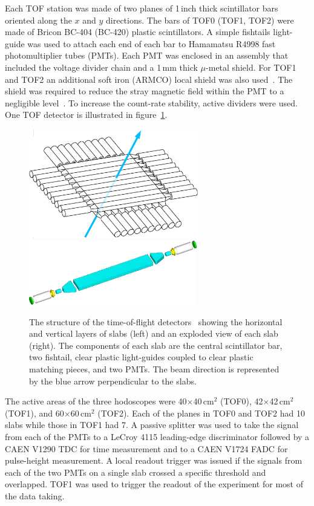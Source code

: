 Each TOF station was made of two planes of 1\,inch thick scintillator
bars oriented along the $x$ and $y$ directions. 
The bars of TOF0 (TOF1, TOF2) were made of Bricon BC-404 (BC-420) plastic scintillators.
A simple fishtails light-guide was used to attach each end of each bar
to Hamamatsu R4998 fast photomultiplier tubes (PMTs).
Each PMT was enclosed in an assembly that included the voltage divider
chain and a 1\,mm thick $\mu$-metal shield.
For TOF1 and TOF2 an additional soft iron (ARMCO) local shield was
also used~\cite{Bonesini_2012,NOTE455}.
The shield was required to reduce the stray magnetic field within the
PMT to a negligible level~\cite{2010NIMPA.615...14B}.
To increase the count-rate stability, active dividers were used.
One TOF detector is illustrated in figure~\ref{fig:tof:schematic}.
\begin{figure}[htb]
  \begin{center}
    \includegraphics[width=7.4cm]{tof_diagram2-with_beam}
    \includegraphics[height=2.8cm]{slab_design2}
  \end{center}
  \caption{
    The structure of the time-of-flight
    detectors~\cite{2010NIMPA.615...14B,NOTE145} showing the
    horizontal and vertical layers of slabs (left) and an exploded
    view of each slab (right). 
    The components of each slab are the central scintillator bar, two
    fishtail, clear plastic light-guides coupled to clear plastic
    matching pieces, and two PMTs.
    The beam direction is represented by the blue arrow perpendicular to the slabs.
  }
  \label{fig:tof:schematic}
\end{figure}

The active areas of the three hodoscopes were 40$\times$40\,cm$^2$
(TOF0), 42$\times$42\,cm$^2$ (TOF1), and 60$\times$60\,cm$^2$ (TOF2).
Each of the planes in TOF0 and TOF2 had 10 slabs while those in TOF1 had 7.
A passive splitter was used to take the signal from each of the PMTs
to a LeCroy 4115 leading-edge discriminator followed by a CAEN
V1290 TDC for time measurement and to a CAEN V1724 FADC for
pulse-height measurement.
A local readout trigger was issued if the signals from each of the two
PMTs on a single slab crossed a specific threshold and overlapped.
TOF1 was used to trigger the readout of the experiment for most of the
data taking. \\


